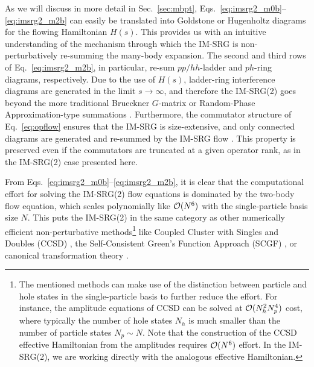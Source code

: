 As we will discuss in more detail in Sec.~\ref{sec:mbpt}, 
Eqs.~\eqref{eq:imsrg2_m0b}--\eqref{eq:imsrg2_m2b} can easily be translated 
into Goldstone or Hugenholtz diagrams for the flowing Hamiltonian $H(s)$.
This provides us with an intuitive understanding of the mechanism through
which the IM-SRG is non-perturbatively re-summing the many-body expansion. The second
and third rows of Eq.~\eqref{eq:imsrg2_m2b}, in particular, re-sum $pp/hh$-ladder and $ph$-ring 
diagrams, respectively. Due to the use of $H(s)$, ladder-ring interference 
diagrams are generated in the limit $s\to\infty$, and therefore the IM-SRG(2) 
goes beyond the more traditional Brueckner $G$-matrix or Random-Phase 
Approximation-type summations \cite{Day:1967zl,Brandow:1967tg,Fetter:2003ve}. 
Furthermore, the commutator structure of Eq.~\eqref{eq:opflow} ensures that 
the IM-SRG is size-extensive, and only connected diagrams are generated and
re-summed by the IM-SRG flow \cite{Brandow:1967tg,Shavitt:2009}. This property
is preserved even if the commutators are truncated at a given operator rank, as in the IM-SRG(2) case presented here. 

From Eqs.~\eqref{eq:imsrg2_m0b}--\eqref{eq:imsrg2_m2b}, it is clear that the computational effort for solving the IM-SRG(2) flow equations is dominated by the two-body flow equation, which scales polynomially like $\mathcal{O}(N^6)$ with the single-particle basis size $N$. This puts the IM-SRG(2) in the same category as other numerically efficient non-perturbative methods\footnote{The mentioned methods can make use of the distinction between particle and hole states in the single-particle basis to further reduce the effort. For instance, the amplitude equations of CCSD can be solved at $\mathcal{O}(N_h^2N_p^4)$ cost, where typically the number of hole states $N_h$ is much smaller than the number of particle states $N_p\sim N$. Note that the construction of the CCSD effective Hamiltonian from the amplitudes requires $\mathcal{O}(N^6)$ effort. In the IM-SRG(2), we are working directly with the analogous effective Hamiltonian.} like Coupled Cluster with Singles and Doubles (CCSD) \cite{Shavitt:2009,Hagen:2014ve}, the Self-Consistent Green's Function Approach (SCGF) \cite{Dickhoff:2004fk,Barbieri:2007fk,Cipollone:2013uq}, or canonical transformation theory \cite{White:2002fk,Yanai:2006uq}.

